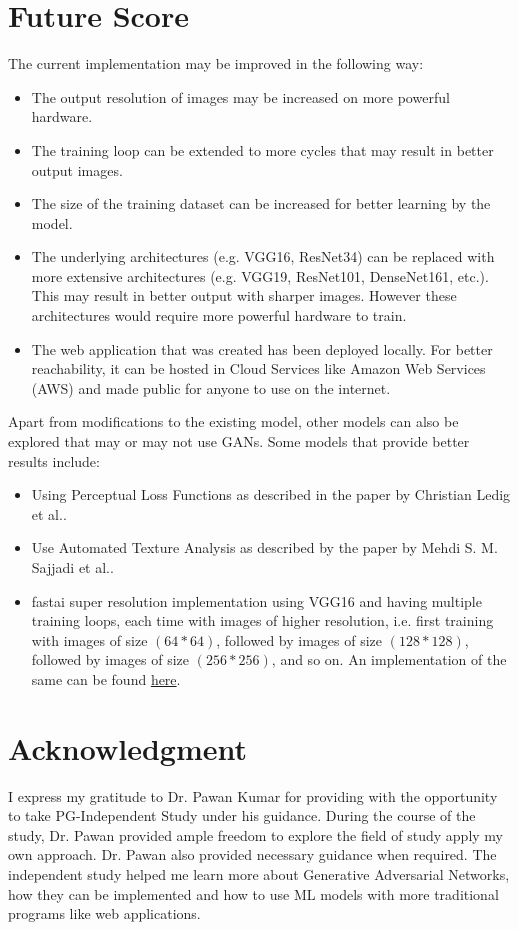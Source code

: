 \documentclass[conference]{IEEEtran}
\begin{document}
	\section{Future Score}
		The current implementation may be improved in the following way:
		\begin{itemize}
			\item The output resolution of images may be increased on more powerful hardware.
			\item The training loop can be extended to more cycles that may result in better output images.
			\item The size of the training dataset can be increased for better learning by the model.
			\item The underlying architectures (e.g. VGG16, ResNet34) can be replaced with more extensive architectures (e.g. VGG19, ResNet101, DenseNet161, etc.). This may result in better output with sharper images. However these architectures would require more powerful hardware to train.
			\item The web application that was created has been deployed locally. For better reachability, it can be hosted in Cloud Services like Amazon Web Services (AWS) and made public for anyone to use on the internet.
		\end{itemize} 
		\par Apart from modifications to the existing model, other models can also be explored that may or may not use GANs. Some models that provide better results include:
		\begin{itemize}
			\item Using Perceptual Loss Functions as described in the paper by Christian Ledig et al.\cite{b19}.
			\item Use Automated Texture Analysis as described by the paper by Mehdi S. M. Sajjadi et al.\cite{b20}.
			\item fastai super resolution implementation using VGG16 and having multiple training loops, each time with images of higher resolution, i.e. first training with images of size $(64 * 64)$, followed by images of size $(128 * 128)$, followed by images of size $(256 * 256)$, and so on. An implementation of the same can be found \href{https://nbviewer.jupyter.org/github/fastai/course-v3/blob/master/nbs/dl1/lesson7-superres.ipynb}{here}.
		\end{itemize}
		
	\section*{Acknowledgment}
		I express my gratitude to Dr. Pawan Kumar for providing with the opportunity to take PG-Independent Study under his guidance. During the course of the study, Dr. Pawan provided ample freedom to explore the field of study apply my own approach. Dr. Pawan also provided necessary guidance when required. The independent study helped me learn more about Generative Adversarial Networks, how they can be implemented and how to use ML models with more traditional programs like web applications.
		
\end{document}
